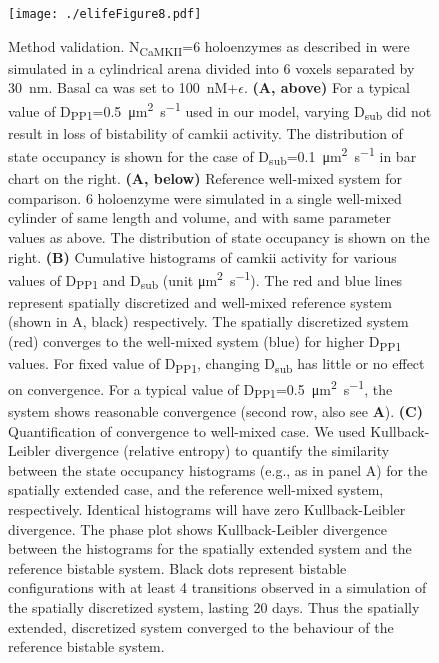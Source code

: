 \documentclass[9pt,lineno,doublespacing]{elife}
\newcommand\SUB[2]{#1\textsubscript{#2}}
\begin{document}
\begin{figure}[ht!]
    \texttt{[image: ./elifeFigure8.pdf]}
    \caption{Method validation. \SUB{N}{CaMKII}=6 holoenzymes as described in
         were simulated in a cylindrical arena
        divided into 6 voxels separated by \SI{30}{\nano\meter}. Basal \gls{ca}
        was set to \SI{100}{\nano M}+$\epsilon$.  
        \textbf{(A, above)} For a typical value of
        \SUB{D}{PP1}=\SI{0.5}{\micro\meter\squared\per\second} used in our
        model, varying \SUB{D}{sub} did not result in loss of bistability of
        \gls{camkii} activity. The distribution of state occupancy is shown for
        the case of \SUB{D}{sub}=\SI{0.1}{\micro\meter\squared\per\second} in
        bar chart on the right.  \textbf{(A, below)} Reference well-mixed system
        for comparison. 6 holoenzyme were simulated in a single well-mixed
        cylinder of same length and volume, and with same parameter values as
        above. The distribution of state occupancy is shown on the right.
        \textbf{(B)} Cumulative histograms of \gls{camkii} activity for various
        values of \SUB{D}{PP1} and \SUB{D}{sub} (unit
        \si{\micro\meter\squared\per\second}). The red and blue lines represent
        spatially discretized and well-mixed reference system (shown in A,
        black) respectively. The spatially discretized system (red) converges to
        the well-mixed system (blue) for higher \SUB{D}{PP1} values.  For fixed
        value of \SUB{D}{PP1}, changing \SUB{D}{sub} has little or no effect on
        convergence. For a typical value of
        \SUB{D}{PP1}=\SI{0.5}{\micro\meter\squared\per\second}, the system shows
        reasonable convergence (second row, also see \textbf{A}).
        \textbf{(C)} Quantification of convergence to well-mixed case. We used
        Kullback-Leibler divergence (relative entropy) to quantify the
        similarity between the state occupancy histograms (e.g., as in panel A)
        for the spatially extended case, and the reference well-mixed system,
        respectively. Identical histograms will have zero Kullback-Leibler
        divergence. The phase plot shows Kullback-Leibler divergence between the
        histograms for the spatially extended system and the reference bistable
        system. Black dots represent bistable configurations with at least 4
        transitions observed in a simulation of the spatially discretized
        system, lasting 20 days.  Thus the spatially extended, discretized
        system converged to the behaviour of the reference bistable system.
    }\label{fig:method_validation} 


\end{figure}
\end{document}
